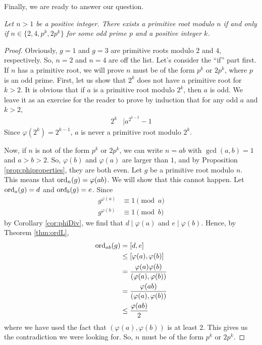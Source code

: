 \documentclass{subfile}
\begin{document}
Finally, we are ready to answer our question.

	\begin{theorem}\slshape
		Let $n>1$ be a positive integer. There exists a primitive root modulo $n$ if and only if $n\in\{2,4,p^k,2p^k\}$ for some odd prime $p$ and a positive integer $k$.
		\label{thm:pr:wh}
	\end{theorem}

	\begin{proof}
		Obviously, $g=1$ and $g=3$ are primitive roots modulo $2$ and $4$, respectively. So, $n=2$ and $n=4$ are off the list. Let's consider the ``if'' part first. If $n$ has a primitive root, we will prove $n$ must be of the form $p^k$ or $2p^k$, where $p$ is an odd prime.
		First, let us show that $2^k$ does not have a primitive root for $k >2$. It is obvious that if $a$ is a primitive root modulo $2^k$, then $a$ is odd. We leave it as an exercise for the reader to prove by induction that for any odd $a$ and $k>2$,
			\begin{align*}
				2^k & \mid a^{2^{k-2}}-1
			\end{align*}
		Since $\varphi(2^k)=2^{k-1}$, $a$ is never a primitive root modulo $2^k$.

		Now, if $n$ is not of the form $p^k$ or $2p^k$, we can write $n=ab$ with $\gcd(a,b)=1$ and $a>b>2$. So, $\varphi(b)$ and $\varphi(a)$ are larger than $1$, and by Proposition \ref{prop:phiproperties}, they are both even. Let $g$ be a primitive root modulo $n$. This means that $\operatorname{ord}_{n}(g)=\varphi(ab)$. We will show that this cannot happen. Let $\operatorname{ord}_a(g)=d$ and $\operatorname{ord}_b(g)=e$. Since
			\begin{align*}
				g^{\varphi(a)} & \equiv1\pmod a\\
				g^{\varphi(b)} & \equiv1\pmod b
			\end{align*}
		by Corollary \eqref{cor:phiDiv}, we find that $d \mid \varphi(a)$ and $e\mid \varphi(b)$.
		Hence, by Theorem \eqref{thm:ordL},
			\begin{align*}
				\operatorname{ord}_{ab}(g)
					& =  [d,e]\\
					& \leq [\varphi(a),\varphi(b)]\\
					& = \dfrac{\varphi(a) \varphi(b)}{(\varphi(a), \varphi(b))}\\
					& = \dfrac{\varphi(ab)}{(\varphi(a), \varphi(b))}\\
					& \leq  \dfrac{\varphi(ab)}{2}
			\end{align*}
		where we have used the fact that $(\varphi(a),\varphi(b))$ is at least $2$. This gives us the contradiction we were looking for. So, $n$ must be of the form $p^k$ or $2p^k$.


\end{proof}
\end{document}
